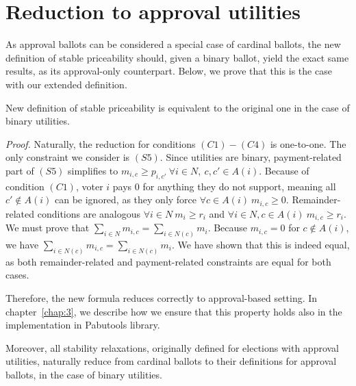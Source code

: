 \section{Reduction to approval utilities}
As approval ballots can be considered a special case of cardinal ballots, the new definition of stable priceability should, given a binary ballot, yield the exact same results, as its approval-only counterpart. Below, we prove that this is the case with our extended definition. 
\begin{theorem}New definition of stable priceability is equivalent to the original one in the case of binary utilities.
\end{theorem}
\emph{Proof.} Naturally, the reduction for conditions $(C1)-(C4)$ is one-to-one. The only constraint we consider is $(S5)$. Since utilities are binary, payment-related part of $(S5)$ simplifies to $m_{i,c}\ge p_{i,c'} \ \forall i \in N, \ c,c' \in A(i)$. Because of condition $(C1)$, voter $i$ pays $0$ for anything they do not support, meaning all $c'\notin A(i)$ can be ignored, as they only force $\forall c \in A(i) \ m_{i,c}\ge 0$. Remainder-related conditions are analogous $\forall i \in N \ m_i\ge r_i$ and $\forall i \in N, c \in A(i) \ m_{i,c}\ge r_i$. We must prove that $\sum_{i\in N}m_{i,c} = \sum_{i\in N(c)}m_i$. Because $m_{i, c}=0$ for $c\notin A(i)$, we have $\sum_{i\in N(c)}m_{i,c} = \sum_{i\in N(c)}m_i$. We have shown that this is indeed equal, as both remainder-related and payment-related constraints are equal for both cases.


Therefore, the new formula reduces correctly to approval-based setting. In chapter~\ref{chap:3}, we describe how we ensure that this property holds also in the implementation in Pabutools library.

Moreover, all stability relaxations, originally defined for elections with approval utilities, naturally reduce from cardinal ballots to their definitions for approval ballots, in the case of binary utilities.

